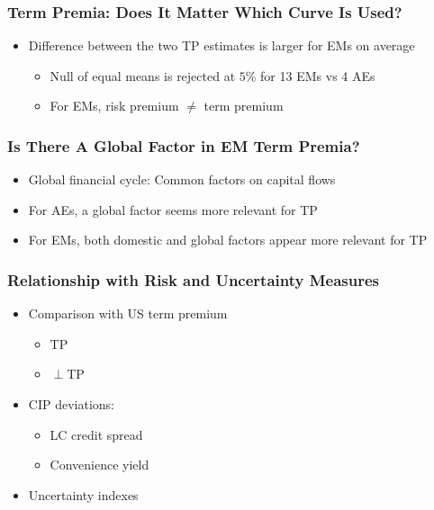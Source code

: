 \documentclass[12pt, aspectratio=169, xcolor=dvipsnames]{beamer} 			         %
\begin{document}
\begin{frame}
	\frametitle{Term Premia: Does It Matter Which Curve Is Used?}
	
	\begin{itemize}
		\item Difference between the two TP estimates is larger for EMs on average
		\begin{itemize}
			\item Null of equal means is rejected at $5$\% for 13 EMs vs 4 AEs
			\item For EMs, risk premium $\neq$ term premium
		\end{itemize}
	\end{itemize}
\end{frame}

\begin{frame}
	\frametitle{Is There A Global Factor in EM Term Premia?}
	
	\begin{itemize}
		\item Global financial cycle: Common factors on capital flows \citep{Rey:2013}
		\item For AEs, a global factor seems more relevant for TP
		\item For EMs, both domestic and global factors appear more relevant for TP
	\end{itemize}
\end{frame}

\begin{frame}
	\frametitle{Relationship with Risk and Uncertainty Measures}
	\begin{itemize}
		\item Comparison with US term premium
		\begin{itemize}
			\item TP
			\item $\perp$TP
		\end{itemize}
		\item CIP deviations: 
		\begin{itemize}
			\item LC credit spread \citep{DuSchreger:2016a}
			\item Convenience yield \citep{DuImSchreger:2018}
		\end{itemize}
		\item Uncertainty indexes \citep{BakerBloomDavis:2016}
	\end{itemize}
\end{frame}
\end{document}
